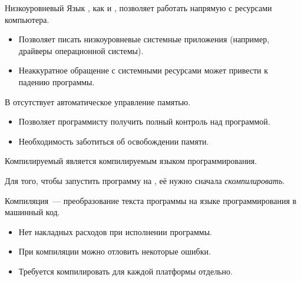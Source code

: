 \documentclass[aspectration=1610,t]{beamer}
\begin{document}
\begin{frame}{Низкоуровневый}
    Язык \langcpp, как и \langc, позволяет работать напрямую 
    с ресурсами компьютера.

    \begin{itemize}
        \item Позволяет писать низкоуровневые системные приложения 
            (например, драйверы операционной системы).
        
        \item
            Неаккуратное обращение с системными ресурсами 
            может привести к падению программы.
    \end{itemize}
    
    В \langcpp отсутствует автоматическое управление памятью. 
    \begin{itemize}
        \item Позволяет программисту получить полный контроль над программой.
            
        \item Необходимость заботиться об освобождении памяти.
    \end{itemize}
\end{frame}

\begin{frame}{Компилируемый}
\langcpp является компилируемым языком программирования.
\medskip

Для того, чтобы запустить программу на \langcpp, её нужно сначала
{\em скомпилировать}.
\medskip

Компиляция~--- преобразование текста программы на языке программирования
в машинный код.

\begin{itemize}
    \item Нет накладных расходов при исполнении программы.
    \item При компиляции можно отловить некоторые ошибки.
    \item Требуется компилировать для каждой платформы отдельно.
\end{itemize}

\end{frame}
\end{document}
